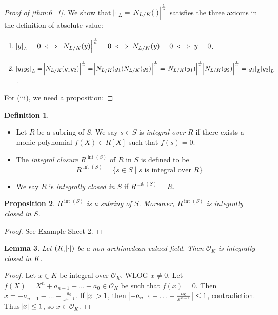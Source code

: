 \documentclass[11pt]{article}
\theoremstyle{definition}
\newtheorem{definition}{Definition}[subsection]
\theoremstyle{plain}
\newtheorem{proposition}[definition]{Proposition}
\newtheorem{lemma}[definition]{Lemma}
\theoremstyle{remark}
\renewcommand{\qedsymbol}{$\blacksquare$}
\DeclareMathOperator{\Int}{int}
\newcommand{\cO}{\mathcal{O}}
\begin{document}
\begin{proof}[Proof of \autoref{thm:6_1}]
    We show that $\abs{\cdot}_L = \abs{N_{L/K}(\cdot)}^\frac{1}{n}$ satisfies the three axioms in the definition of absolute value:
    \begin{enumerate}
        \item $\abs{y}_L = 0 \iff \abs{N_{L/K}(y)}^\frac{1}{n} = 0 \iff N_{L/K}(y) = 0 \iff y = 0$.
        \item $\abs{y_1 y_2}_L = \abs{N_{L/K}(y_1 y_2)}^\frac{1}{n} = \abs{N_{L/K}(y_1) N_{L/K}(y_2)}^\frac{1}{n} = \abs{N_{L/K}(y_1)}^\frac{1}{n} \abs{N_{L/K}(y_2)}^\frac{1}{n} = \abs{y_1}_L \abs{y_2}_L$.
    \end{enumerate}
    For (iii), we need a proposition:
    \renewcommand*{\qedsymbol}{}
\end{proof}

\begin{definition}\phantom{}
    \begin{itemize}
        \item Let $R$ be a subring of $S$. We say $s \in S$ is \emph{integral over $R$} if there exists a monic polynomial $f(X) \in R[X]$ such that $f(s) = 0$.
        \item The \emph{integral closure} $R^{\Int(S)}$ of $R$ in $S$ is defined to be
            \begin{equation*}
                R^{\Int(S)} = \{s \in S \mid s \text{ is integral over } R\}
            \end{equation*}
        \item We say $R$ is \emph{integrally closed in $S$} if $R^{\Int(S)} = R$.
    \end{itemize}
\end{definition}

\begin{proposition}\label{prop:6_7}
    $R^{\Int(S)}$ is a subring of $S$. Moreover, $R^{\Int(S)}$ is integrally closed in $S$.
\end{proposition}
\begin{proof}
    See Example Sheet 2.
\end{proof}

\begin{lemma}\label{lem:6_8}
    Let $(K, \abs{\cdot})$ be a non-archimedean valued field. Then $\cO_K$ is integrally closed in $K$.
\end{lemma}
\begin{proof}
    Let $x \in K$ be integral over $\cO_K$. WLOG $x \neq 0$. Let $f(X) = X^n + a_{n-1} + \ldots + a_0 \in \cO_K$  be such that $f(x) = 0$. Then $x = -a_{n-1} - \ldots - \frac{a_0}{x^{n-1}}$. If $\abs{x} > 1$, then $\abs{-a_{n-1} - \ldots - \frac{a_0}{x^{n-1}}} \le 1$, contradiction. Thus $\abs{x} \le 1$, so $x \in \cO_K$.
\end{proof}
\end{document}
